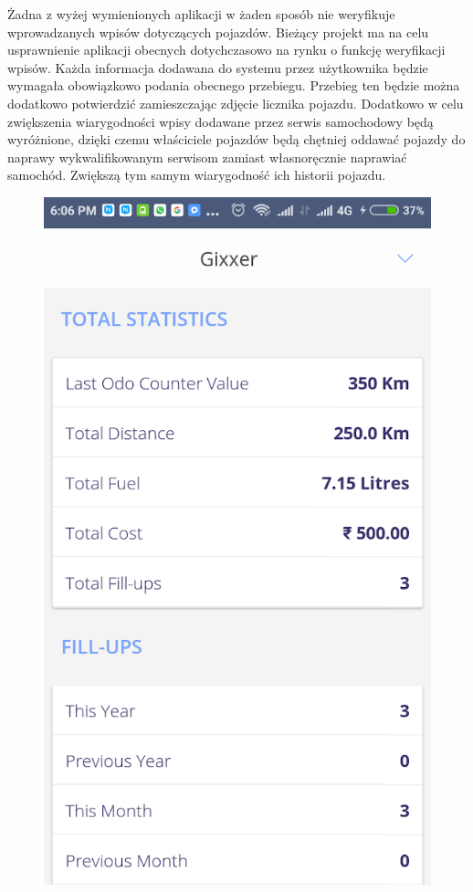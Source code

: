 \documentclass[12pt]{article}
\begin{document}
Żadna z wyżej wymienionych aplikacji w żaden sposób nie weryfikuje wprowadzanych wpisów dotyczących pojazdów. Bieżący projekt ma na celu usprawnienie aplikacji obecnych dotychczasowo na rynku o funkcję weryfikacji wpisów. Każda informacja dodawana do systemu przez użytkownika będzie wymagała obowiązkowo podania obecnego przebiegu. Przebieg ten będzie można dodatkowo potwierdzić zamieszczając zdjęcie licznika pojazdu. Dodatkowo w celu zwiększenia wiarygodności wpisy dodawane przez serwis samochodowy będą wyróżnione, dzięki czemu właściciele pojazdów będą chętniej oddawać pojazdy do naprawy wykwalifikowanym serwisom zamiast własnoręcznie naprawiać samochód. Zwiększą tym samym wiarygodność ich historii pojazdu.

\begin{figure}
	\centering
		\includegraphics[scale=0.5]{mob1.png}

\end{figure}
\end{document}
